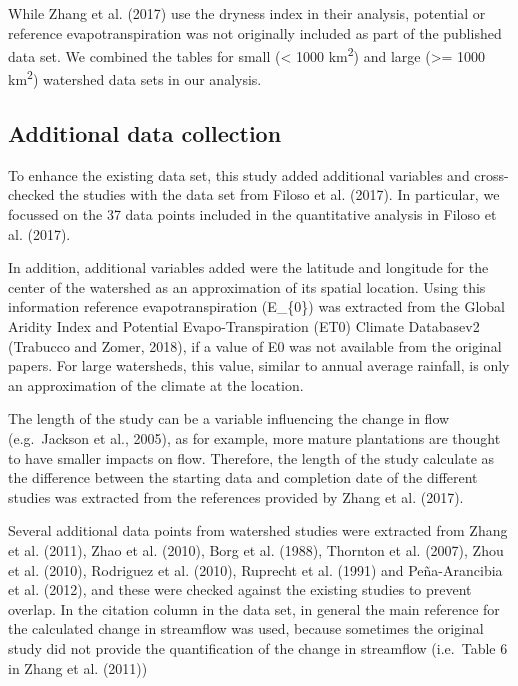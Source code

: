 \documentclass[]{elsarticle} %
\begin{document}
While Zhang et al. (2017) use the dryness index in their analysis,
potential or reference evapotranspiration was not originally included as
part of the published data set. We combined the tables for small
(\textless{} 1000 km\textsuperscript{2}) and large (\textgreater= 1000
km\textsuperscript{2}) watershed data sets in our analysis.

\hypertarget{additional-data-collection}{%
\subsection{Additional data
collection}\label{additional-data-collection}}

To enhance the existing data set, this study added additional variables
and cross-checked the studies with the data set from Filoso et al.
(2017). In particular, we focussed on the 37 data points included in the
quantitative analysis in Filoso et al. (2017).

In addition, additional variables added were the latitude and longitude
for the center of the watershed as an approximation of its spatial
location. Using this information reference evapotranspiration (E\_\{0\})
was extracted from the Global Aridity Index and Potential
Evapo-Transpiration (ET0) Climate Databasev2 (Trabucco and Zomer, 2018),
if a value of E0 was not available from the original papers. For large
watersheds, this value, similar to annual average rainfall, is only an
approximation of the climate at the location.

The length of the study can be a variable influencing the change in flow
(e.g.~Jackson et al., 2005), as for example, more mature plantations are
thought to have smaller impacts on flow. Therefore, the length of the
study calculate as the difference between the starting data and
completion date of the different studies was extracted from the
references provided by Zhang et al. (2017).

Several additional data points from watershed studies were extracted
from Zhang et al. (2011), Zhao et al. (2010), Borg et al. (1988),
Thornton et al. (2007), Zhou et al. (2010), Rodriguez et al. (2010),
Ruprecht et al. (1991) and Peña-Arancibia et al. (2012), and these were
checked against the existing studies to prevent overlap. In the citation
column in the data set, in general the main reference for the calculated
change in streamflow was used, because sometimes the original study did
not provide the quantification of the change in streamflow (i.e.~Table 6
in Zhang et al. (2011))
\end{document}
